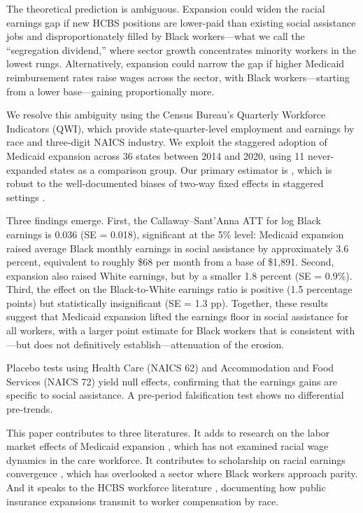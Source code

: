 \documentclass[12pt]{article}
\begin{document}
The theoretical prediction is ambiguous. Expansion could widen the racial earnings gap if new HCBS positions are lower-paid than existing social assistance jobs and disproportionately filled by Black workers---what we call the ``segregation dividend,'' where sector growth concentrates minority workers in the lowest rungs. Alternatively, expansion could narrow the gap if higher Medicaid reimbursement rates raise wages across the sector, with Black workers---starting from a lower base---gaining proportionally more.

We resolve this ambiguity using the Census Bureau's Quarterly Workforce Indicators (QWI), which provide state-quarter-level employment and earnings by race and three-digit NAICS industry. We exploit the staggered adoption of Medicaid expansion across 36 states between 2014 and 2020, using 11 never-expanded states as a comparison group. Our primary estimator is \citet{callaway2021difference}, which is robust to the well-documented biases of two-way fixed effects in staggered settings \citep{goodman2021difference, sun2021estimating, dechaisemartin2020two}.

Three findings emerge. First, the Callaway--Sant'Anna ATT for log Black earnings is 0.036 (SE = 0.018), significant at the 5\% level: Medicaid expansion raised average Black monthly earnings in social assistance by approximately 3.6 percent, equivalent to roughly \$68 per month from a base of \$1,891. Second, expansion also raised White earnings, but by a smaller 1.8 percent (SE = 0.9\%). Third, the effect on the Black-to-White earnings ratio is positive (1.5 percentage points) but statistically insignificant (SE = 1.3 pp). Together, these results suggest that Medicaid expansion lifted the earnings floor in social assistance for all workers, with a larger point estimate for Black workers that is consistent with---but does not definitively establish---attenuation of the erosion.

Placebo tests using Health Care (NAICS 62) and Accommodation and Food Services (NAICS 72) yield null effects, confirming that the earnings gains are specific to social assistance. A pre-period falsification test shows no differential pre-trends.

This paper contributes to three literatures. It adds to research on the labor market effects of Medicaid expansion \citep{duggan2019economic, miller2021medicaid}, which has not examined racial wage dynamics in the care workforce. It contributes to scholarship on racial earnings convergence \citep{bayer2018divergent, derenoncourt2022wealth}, which has overlooked a sector where Black workers approach parity. And it speaks to the HCBS workforce literature \citep{scales2020keeping}, documenting how public insurance expansions transmit to worker compensation by race.
\end{document}
